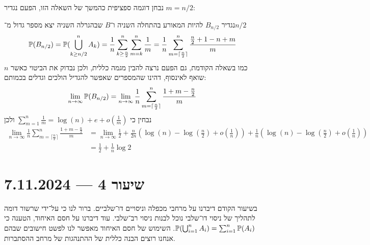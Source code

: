 נבחן דוגמה ספציפית כהמשך של השאלה הזו, הפעם נגדיר $m = n / 2$:
\begin{example}
	נגדיר $B_{n / 2}$ להיות המאורע בהתחלה השניה ו־$B$ שבהגרלה השניה יצא מספר גדול מ־$n / 2$
	\[
		\mathbb{P}(B_{n / 2}) = \mathbb{P}(\bigcup_{k \ge n / 2}^n A_k)
		= \frac{1}{n} \sum_{k \ge \frac{n}{2}}^n \sum_{m = k}^n \frac{1}{m}
		= \frac{1}{n} \sum_{m = \lceil \frac{n}{2}\rceil}^{n} \frac{\frac{n}{2} + 1 - n + m}{m}
	\]
	כמו בשאלה הקודמת, גם הפעם נרצה להבין מגמה כללית, ולכן נבדוק את הביטוי כאשר $n$ שואף לאינסוף, דהינו שהמספרים שאפשר להגדיל הולכים וגדלים בכמותם:
	\[
		\lim_{n \to \infty} \mathbb{P}(B_{n / 2})
		= \lim_{n \to \infty} \frac{1}{n} \sum_{m = \lceil \frac{n}{2}\rceil}^{n} \frac{1 + m - \frac{n}{2}}{m}
	\]
	נבחין כי $\sum_{m = 1}^n \frac{1}{m} = \log(n) + e + o(\frac{1}{m})$ ולכן
	\begin{align*}
		\lim_{n \to \infty} \frac{1}{n} \sum_{m = \lceil \frac{n}{2}\rceil}^{n} \frac{1 + m - \frac{n}{2}}{m}
		& = \lim_{n \to \infty} \frac{1}{2} + \frac{n}{2n} (\log(n) - \log(\frac{n}{2}) + o(\frac{1}{n})) + \frac{1}{n} (\log(n) - \log(\frac{n}{2}) + o(\frac{1}{n})) \\
		& = \frac{1}{2} + \frac{1}{n} \log 2
	\end{align*}
\end{example}

\section{שיעור 4 --- 7.11.2024}
בשיעור הקודם דיברנו על מרחבי מכפלה וניסויים דו־שלביים.
ברור לנו כי על־ידי שרשור דומה לתהליך של ניסוי דו־שלבי נוכל לבנות ניסוי רב־שלבי.
עוד דיברנו על חסם האיחוד, הטענה כי $\mathbb{P}(\bigcup_{i = 1}^n A_i) = \sum_{i = 1}^n \mathbb{P}(A_i)$.
השימוש של חסם האיחוד מאפשר לנו לפשט חישובים שבהם אנחנו רוצים הבנה כללית של ההתנהגות של מרחב ההסתברות.

